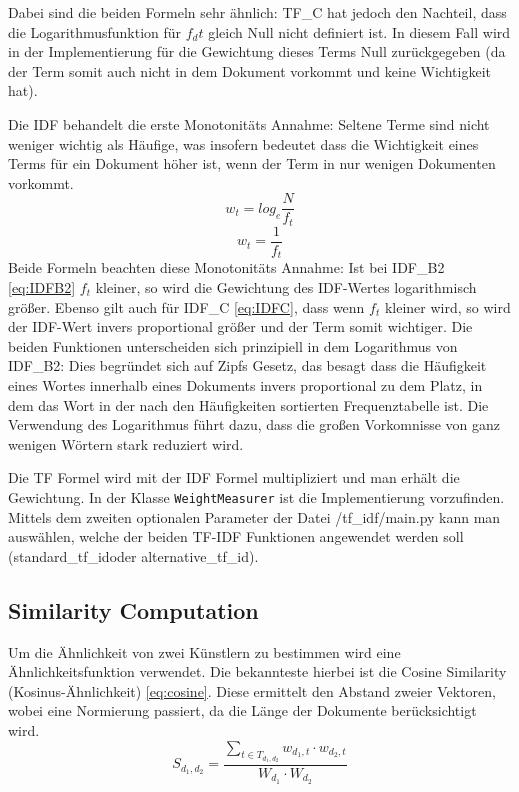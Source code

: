 \documentclass[prodmode,acmtecs]{acmsmall} %
\begin{document}
Dabei sind die beiden Formeln sehr ähnlich: TF\_C hat jedoch den Nachteil, dass die Logarithmusfunktion für $f_dt$ gleich Null nicht definiert ist. In diesem Fall wird in der Implementierung für die Gewichtung dieses Terms Null zurückgegeben (da der Term somit auch nicht in dem Dokument vorkommt und keine Wichtigkeit hat). 

Die IDF behandelt die erste Monotonitäts Annahme: Seltene Terme sind nicht weniger wichtig als Häufige, was insofern bedeutet dass die Wichtigkeit eines Terms für ein Dokument höher ist, wenn der Term in nur wenigen Dokumenten vorkommt.
\begin{equation}\label{eq:IDFB2}
  w_{t} = log_{e} \frac{N}{f_{t}}
\end{equation}
\begin{equation}\label{eq:IDFC}
  w_{t} = \frac{1}{f_{t}}
\end{equation}
Beide Formeln beachten diese Monotonitäts Annahme: Ist bei IDF\_B2 \eqref{eq:IDFB2} $f_t$ kleiner, so wird die Gewichtung des IDF-Wertes logarithmisch größer. Ebenso gilt auch für IDF\_C \eqref{eq:IDFC}, dass wenn $f_t$ kleiner wird, so wird der IDF-Wert invers proportional größer und der Term somit wichtiger. Die beiden Funktionen unterscheiden sich prinzipiell in dem Logarithmus von IDF\_B2: Dies begründet sich auf Zipfs Gesetz, das besagt dass die Häufigkeit eines Wortes innerhalb eines Dokuments invers proportional zu dem Platz, in dem das Wort in der nach den Häufigkeiten sortierten Frequenztabelle ist. Die Verwendung des Logarithmus führt dazu, dass die großen Vorkomnisse von ganz wenigen Wörtern stark reduziert wird.

Die TF Formel wird mit der IDF Formel multipliziert und man erhält die Gewichtung. In der Klasse \texttt{WeightMeasurer} ist die Implementierung vorzufinden. Mittels dem zweiten optionalen Parameter der Datei /tf\_idf/main.py kann man auswählen, welche der beiden TF-IDF Funktionen angewendet werden soll (\glqq standard\_tf\_id\grqq oder \glqq alternative\_tf\_id\grqq).

\subsection{Similarity Computation}
Um die Ähnlichkeit von zwei Künstlern zu bestimmen wird eine Ähnlichkeitsfunktion verwendet. Die bekannteste hierbei ist die Cosine Similarity (Kosinus-Ähnlichkeit) \eqref{eq:cosine}. Diese ermittelt den Abstand zweier Vektoren, wobei eine Normierung passiert, da die Länge der Dokumente berücksichtigt wird. 
\begin{equation}\label{eq:cosine}
  S_{d_1, d_2} = \frac{\sum_{t \in T_{d_1, d_2}}{w_{d_1, t} \cdot w_{d_2, t}}}{W_{d_1} \cdot W_{d_2}}
\end{equation}
\end{document}
